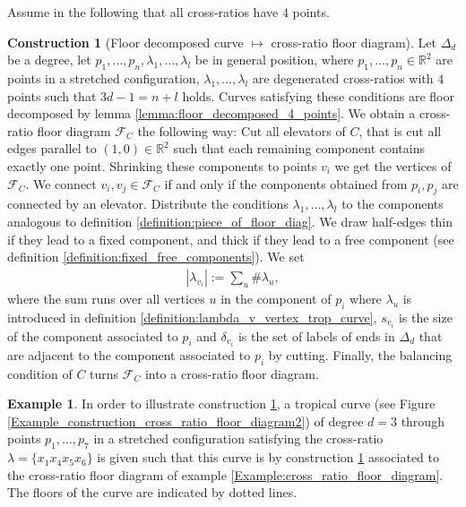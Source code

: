 \documentclass[11pt,reqno,a4]{amsart}
\theoremstyle{dotless}
\theoremstyle{definition}
\newtheorem{construction}[corollary]{Construction}
\newtheorem{example}[corollary]{Example}
\begin{document}
Assume in the following that all cross-ratios have $4$ points.

\begin{construction}[Floor decomposed curve $\mapsto$ cross-ratio floor diagram]\label{construction:floor_decomposed_curve_to_CR_floor_diag}
Let $\Delta_d$ be a degree, let $p_1,\dots,p_n,\lambda_1,\dots,\lambda_l$ be in general position, where $p_1,\dots,p_n\in\mathbb{R}^2$ are points in a stretched configuration, $\lambda_1,\dots,\lambda_l$ are degenerated cross-ratios with  $4$ points such that $3d-1=n+l$ holds. Curves satisfying these conditions are floor decomposed by lemma \ref{lemma:floor_decomposed_4_points}. We obtain a cross-ratio floor diagram $\mathcal{F}_C$ the following way: Cut all elevators of $C$, that is cut all edges parallel to $(1,0)\in\mathbb{R}^2$ such that each remaining component contains exactly one point. Shrinking these components to points $v_i$ we get the vertices of $\mathcal{F}_C$. We connect  $v_i,v_j\in\mathcal{F}_C$ if and only if the components obtained from $p_i,p_j$ are connected by an elevator. Distribute the conditions $\lambda_1,\dots,\lambda_l$ to the components analogous to definition \ref{definition:piece_of_floor_diag}.
We draw half-edges thin if they lead to a fixed component, and thick if they lead to a free component (see definition \ref{definition:fixed_free_components}).
We set
\begin{align*}
|\lambda_{v_i}|:=\sum_u \#\lambda_u,
\end{align*}
where the sum runs over all vertices $u$ in the component  of $p_i$ where $\lambda_u$ is introduced in definition \ref{definition:lambda_v_vertex_trop_curve}, $s_{v_i}$ is the size of the component associated to $p_i$ and $\delta_{v_i}$ is the set of labels of ends in $\Delta_d$ that are adjacent to the component associated to $p_i$ by cutting. Finally, the balancing condition of $C$ turns $\mathcal{F}_C$ into a cross-ratio floor diagram.
\end{construction}


\begin{example}
In order to illustrate construction \ref{construction:floor_decomposed_curve_to_CR_floor_diag}, a tropical curve (see Figure \ref{Example_construction_cross_ratio_floor_diagram2}) of degree $d=3$ through points $p_1,\dots,p_7$ in a stretched configuration satisfying the cross-ratio $\lambda=\lbrace x_1x_4x_5x_6\rbrace$ is given such that this curve is by construction \ref{construction:floor_decomposed_curve_to_CR_floor_diag} associated to the cross-ratio floor diagram of example \ref{Example:cross_ratio_floor_diagram}. The floors of the curve are indicated by dotted lines.
\end{example}
\end{document}
